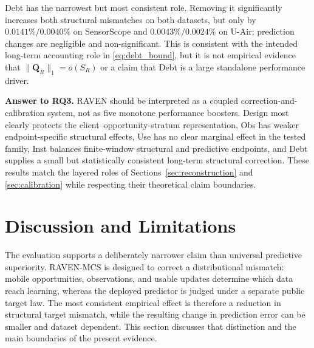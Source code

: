 \documentclass[letterpaper,journal]{IEEEtran}
\begin{document}
Debt has the narrowest but most consistent role.  Removing it significantly
increases both structural mismatches on both datasets, but only by
$0.0141\%/0.0040\%$ on SensorScope and
$0.0043\%/0.0024\%$ on U-Air; prediction changes are negligible and
non-significant.  This is consistent with the intended long-term accounting
role in \eqref{eq:debt_bound}, but it is not empirical evidence that
$\|\mathbf Q_R\|_1=o(S_R)$ or a claim that Debt is a large standalone
performance driver.

\noindent\textbf{Answer to RQ3.}
RAVEN should be interpreted as a coupled correction-and-calibration system, not
as five monotone performance boosters.  Design most clearly protects the
client--opportunity-stratum representation, Obs has weaker endpoint-specific
structural effects, Use has no clear marginal effect in the tested family, Inst
balances finite-window structural and predictive endpoints, and Debt supplies a
small but statistically consistent long-term structural correction.  These
results match the layered roles of Sections~\ref{sec:reconstruction} and
\ref{sec:calibration} while respecting their theoretical claim boundaries.

%

\section{Discussion and Limitations}
\label{sec:discussion}

The evaluation supports a deliberately narrower claim than universal predictive
superiority.  RAVEN-MCS is designed to correct a distributional mismatch:
mobile opportunities, observations, and usable updates determine which data
reach learning, whereas the deployed predictor is judged under a separate
public target law.  The most consistent empirical effect is therefore a
reduction in structural target mismatch, while the resulting change in
prediction error can be smaller and dataset dependent.  This section discusses
that distinction and the main boundaries of the present evidence.
\end{document}
